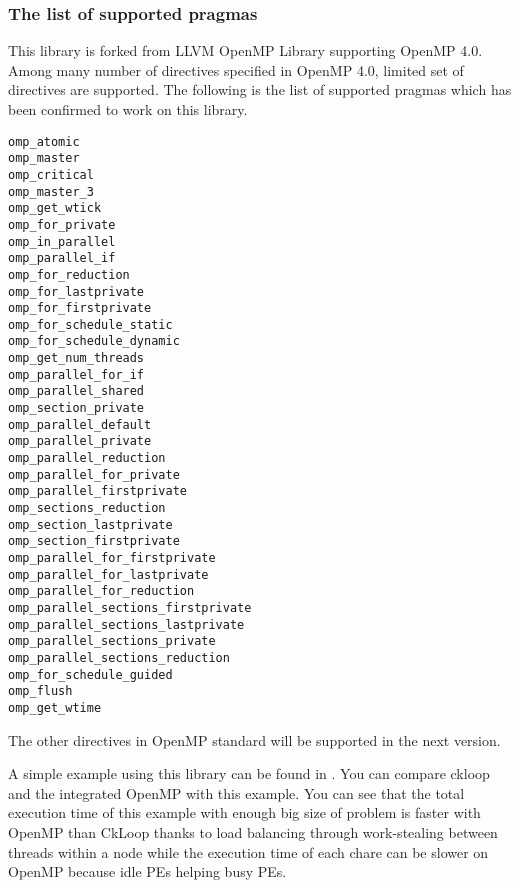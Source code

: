 \subsubsection{The list of supported pragmas}
This library is forked from LLVM OpenMP Library supporting OpenMP 4.0. Among many number of 
directives specified in OpenMP 4.0,  limited set of directives are supported. 
The following is the list of supported pragmas which has been confirmed to work on this library. 
\begin{verbatim}
omp_atomic
omp_master
omp_critical
omp_master_3
omp_get_wtick
omp_for_private
omp_in_parallel
omp_parallel_if
omp_for_reduction
omp_for_lastprivate
omp_for_firstprivate
omp_for_schedule_static
omp_for_schedule_dynamic
omp_get_num_threads
omp_parallel_for_if
omp_parallel_shared
omp_section_private
omp_parallel_default
omp_parallel_private
omp_parallel_reduction
omp_parallel_for_private
omp_parallel_firstprivate
omp_sections_reduction
omp_section_lastprivate
omp_section_firstprivate
omp_parallel_for_firstprivate
omp_parallel_for_lastprivate
omp_parallel_for_reduction
omp_parallel_sections_firstprivate
omp_parallel_sections_lastprivate
omp_parallel_sections_private
omp_parallel_sections_reduction
omp_for_schedule_guided
omp_flush
omp_get_wtime
\end{verbatim}
The other directives in OpenMP standard will be supported in the next version.

A simple example using this library can be found in . You can compare ckloop 
and the integrated OpenMP with this example. You can see that the total execution time of 
this example with enough big size of problem is faster with OpenMP than CkLoop thanks to 
load balancing through work-stealing between threads within a node while the execution 
time of each chare can be slower on OpenMP because idle PEs helping busy PEs.
